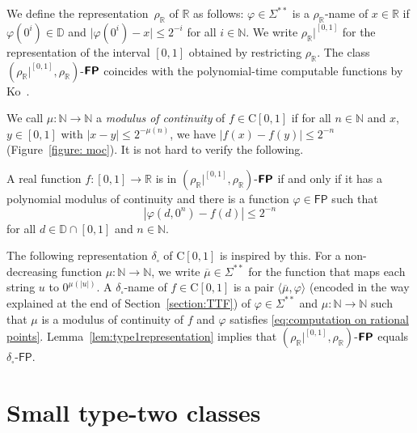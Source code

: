 \documentclass[envcountsect,envcountsame,orivec,oribibl]{llncs}
\newcommand{\R}{\mathbb R}
\newcommand{\N}{\mathbb N}
\newcommand{\D}{\mathbb D}
\newcommand{\classonefont}[1]{\mathsf{#1}}
\newcommand{\classFP}{\classonefont{FP}}
\newcommand{\classtwofont}[1]{\text{\bfseries \sffamily \upshape #1}}
\newcommand{\classFPtwo}{\classtwofont{FP}}
\newcommand{\deltabox}{\delta _\square}
\newcommand{\rhoR}{\rho _\R}
\newcommand{\classC}{\mathrm C}
\newcommand{\LM}{\varSigma ^{**}}
\begin{document}
We define the representation~$\rhoR$ of $\R$ as follows: 
$\varphi \in \LM$ is a $\rhoR$-name of $x \in \R$ 
if $\varphi(0^i) \in \D$ and $\lvert \varphi(0^i) - x \rvert \le 2^{-i}$
for all $i \in \N$.
We write $\rhoR|^{[0,1]}$ for the representation of the interval $[0, 1]$ 
obtained by restricting $\rhoR$.
The class $(\rhoR|^{[0,1]},\rhoR)$-$\classFPtwo$ 
coincides with 
the polynomial-time computable functions by Ko~\cite{ko1991complexity}. 

We call $\mu \colon \N \to \N$ a {\em modulus of continuity} 
of $f \in \classC [0, 1]$ 
if 
for all $n \in \N$ and $x$, $y \in [0,1]$ with
$|x - y| \le 2^{-\mu(n)}$, 
we have $|f(x) - f(y)| \le 2^{-n}$ (Figure~\ref{figure: moc}). 
It is not hard to verify the following. 

\begin{lemma}
 \label{lem:type1representation}
 A real function $f \colon [0, 1] \to \R$ 
 is in $(\rhoR|^{[0,1]},\rhoR)$-$\classFPtwo$ if and only if
 it has a polynomial modulus of continuity 
 and there is a function $\varphi \in \classFP$ such that 
 \begin{equation}
   \label{eq:computation on rational points}
  |\varphi(d, 0^n) - f(d)| \le 2^{-n} 
 \end{equation}
 for all $d \in \D \cap [0,1]$ and $n \in \N$. 
\end{lemma}

The following representation $\deltabox$ of $\classC[0,1]$ 
is inspired by this. 
For a non-decreasing function $\mu \colon \N \to \N$, 
we write $\overline \mu \in \LM$ for the 
function that maps each string $u$ to $0^{\mu(|u|)}$.
A $\deltabox$-name of $f \in \classC[0,1]$ is 
a pair $\langle \overline{\mu}, \varphi \rangle$
(encoded in the way explained at the end of Section~\ref{section:TTF})
of $\varphi \in \LM$ and $\mu \colon \N \to \N$
such that 
$\mu$ is a modulus of continuity of $f$
and $\varphi$ satisfies \eqref{eq:computation on rational points}.
Lemma~\ref{lem:type1representation} implies that
$(\rhoR|^{[0,1]},\rhoR)$-$\classFPtwo$ equals
$\deltabox$-$\classFP$. 

\section{Small type-two classes}
\label{section:small-classes}
\end{document}
